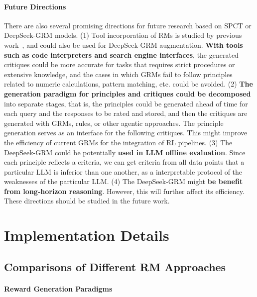 \documentclass{article} %
\newcommand{\SGRMAll}{DeepSeek-GRM\xspace}
\begin{document}
\paragraph{Future Directions}
There are also several promising directions for future research based on SPCT or \SGRMAll models. 
(1) Tool incorporation of RMs is studied by previous work~\citep{li2024toolaugmented}, and could also be used for \SGRMAll augmentation. \textbf{With tools such as code interpreters and search engine interfaces}, the generated critiques could be more accurate for tasks that requires strict procedures or extensive knowledge, and the cases in which GRMs fail to follow principles related to numeric calculations, pattern matching, etc. could be avoided. 
(2) \textbf{The generation paradigm for principles and critiques could be decomposed} into separate stages, that is, the principles could be generated ahead of time for each query and the responses to be rated and stored, and then the critiques are generated with GRMs, rules, or other agentic approaches. The principle generation serves as an interface for the following critiques. This might improve the efficiency of current GRMs for the integration of RL pipelines. 
(3) The \SGRMAll could be potentially \textbf{used in LLM offline evaluation}. Since each principle reflects a criteria, we can get criteria from all data points that a particular LLM is inferior than one another, as a interpretable protocol of the weaknesses of the particular LLM. 
(4) The \SGRMAll might \textbf{be benefit from long-horizon reasoning}. However, this will further affect its efficiency. These directions should be studied in the future work. 

\section{Implementation Details}

\subsection{Comparisons of Different RM Approaches}\label{app:method-comp-detail}

\paragraph{Reward Generation Paradigms}
\end{document}
